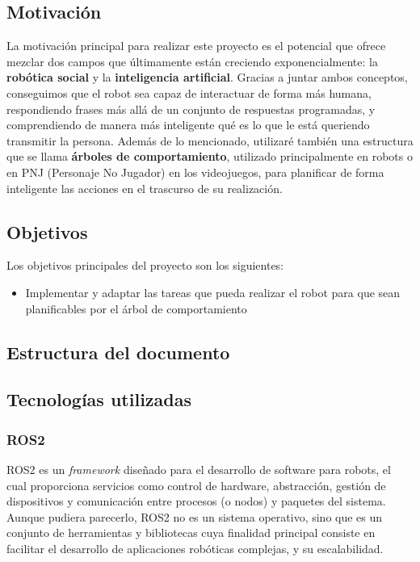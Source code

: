 \documentclass[../main.tex]{subfiles}
\begin{document}
\subsection{Motivación}
La motivación principal para realizar este proyecto es el potencial que ofrece mezclar dos campos que últimamente están creciendo exponencialmente: la \textbf{robótica social} y la \textbf{inteligencia artificial}. Gracias 
a juntar ambos conceptos, conseguimos que el robot sea capaz de interactuar de forma más humana, respondiendo frases más allá de un conjunto de respuestas programadas, y comprendiendo
de manera más inteligente qué es lo que le está queriendo transmitir la persona. Además de lo mencionado, utilizaré también una estructura que se llama \textbf{árboles de comportamiento}, utilizado principalmente
en robots o en PNJ (Personaje No Jugador) en los videojuegos, para planificar de forma inteligente las acciones en el trascurso de su realización.

\subsection{Objetivos}
Los objetivos principales del proyecto son los siguientes:
\begin{itemize}
    
    \item Implementar y adaptar las tareas que pueda realizar el robot para que sean planificables por el árbol de comportamiento
\end{itemize}

\subsection{Estructura del documento}
\blindtext

\subsection{Tecnologías utilizadas}

\subsubsection{ROS2}
ROS2 es un \textit{framework} diseñado para el desarrollo de software para robots, el cual proporciona servicios como control de hardware,
abstracción, gestión de dispositivos y comunicación entre procesos (o nodos) y paquetes del sistema. Aunque pudiera parecerlo, ROS2 no es un sistema operativo, sino 
que es un conjunto de herramientas y bibliotecas cuya finalidad principal consiste en facilitar el desarrollo de aplicaciones robóticas complejas,
y su escalabilidad.
\end{document}
